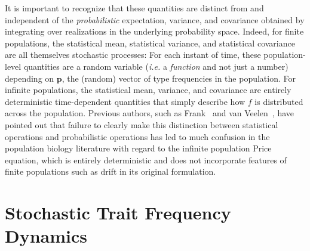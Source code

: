 It is important to recognize that these quantities are distinct from and independent of the \emph{probabilistic} expectation, variance, and covariance obtained by integrating over realizations in the underlying probability space. Indeed, for finite populations, the statistical mean, statistical variance, and statistical covariance are all themselves stochastic processes: For each instant of time, these population-level quantities are a random variable (\emph{i.e.} a \emph{function} and not just a number) depending on $\mathbf{p}$, the (random) vector of type frequencies in the population. For infinite populations, the statistical mean, variance, and covariance are entirely deterministic time-dependent quantities that simply describe how $f$ is distributed across the population. Previous authors, such as Frank~\citep{frank_price_1997,frank_natural_2012} and van Veelen~\citep{van_veelen_use_2005,van_veelen_problem_2020}, have pointed out that failure to clearly make this distinction between statistical operations and probabilistic operations has led to much confusion in the population biology literature with regard to the infinite population Price equation, which is entirely deterministic and does not incorporate features of finite populations such as drift in its original formulation.

\section{Stochastic Trait Frequency Dynamics}\label{sec_nD_freq_eqns}

